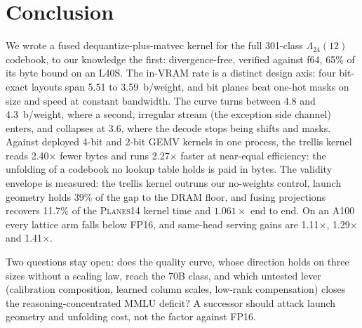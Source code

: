 \section{Conclusion}
\label{sec:conclusion}

We wrote a fused dequantize-plus-matvec kernel for the full 301-class
$\Lambda_{24}(12)$ codebook, to our knowledge the first: divergence-free, verified against
f64, 65\% of its byte bound on an L40S. The in-VRAM rate is a distinct design
axis: four bit-exact layouts span 5.51 to 3.59~b/weight, and bit planes beat
one-hot masks on size and speed at constant bandwidth. The curve turns
between 4.8 and 4.3~b/weight, where a second, irregular stream (the
exception side channel) enters, and collapses at 3.6, where the decode stops
being shifts and masks. Against deployed 4-bit and 2-bit GEMV kernels
in one process, the trellis kernel reads 2.40$\times$ fewer bytes and runs
2.27$\times$ faster at near-equal efficiency: the unfolding of a codebook
no lookup table holds is paid in bytes. The validity envelope is measured: the
trellis kernel outruns our no-weights control, launch geometry holds 39\% of
the gap to the DRAM floor, and fusing projections recovers 11.7\% of the
\textsc{Planes14} kernel time and $1.061\times$ end to end. On an A100 every lattice arm falls below
FP16, and same-head serving gains are 1.11$\times$, 1.29$\times$ and
1.41$\times$.

Two questions stay open: does the quality curve, whose direction holds on
three sizes without a scaling law, reach the 70B class, and which untested
lever (calibration composition, learned column scales, low-rank
compensation) closes the reasoning-concentrated MMLU deficit? A successor
should attack launch geometry and unfolding cost, not the factor against
FP16.
